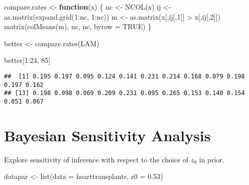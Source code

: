 \documentclass[
]{book}
\newenvironment{Shaded}{\begin{snugshade}}{\end{snugshade}}
\newcommand{\AttributeTok}[1]{\textcolor[rgb]{0.77,0.63,0.00}{#1}}
\newcommand{\ConstantTok}[1]{\textcolor[rgb]{0.00,0.00,0.00}{#1}}
\newcommand{\ControlFlowTok}[1]{\textcolor[rgb]{0.13,0.29,0.53}{\textbf{#1}}}
\newcommand{\DecValTok}[1]{\textcolor[rgb]{0.00,0.00,0.81}{#1}}
\newcommand{\FloatTok}[1]{\textcolor[rgb]{0.00,0.00,0.81}{#1}}
\newcommand{\FunctionTok}[1]{\textcolor[rgb]{0.00,0.00,0.00}{#1}}
\newcommand{\NormalTok}[1]{#1}
\newcommand{\OtherTok}[1]{\textcolor[rgb]{0.56,0.35,0.01}{#1}}
\newcommand{\SpecialCharTok}[1]{\textcolor[rgb]{0.00,0.00,0.00}{#1}}
\begin{document}
\begin{Shaded}
\begin{Highlighting}[]
\NormalTok{compare.rates }\OtherTok{\textless{}{-}} \ControlFlowTok{function}\NormalTok{(x) \{}
\NormalTok{  nc }\OtherTok{\textless{}{-}} \FunctionTok{NCOL}\NormalTok{(x)}
\NormalTok{  ij }\OtherTok{\textless{}{-}} \FunctionTok{as.matrix}\NormalTok{(}\FunctionTok{expand.grid}\NormalTok{(}\DecValTok{1}\SpecialCharTok{:}\NormalTok{nc, }\DecValTok{1}\SpecialCharTok{:}\NormalTok{nc))}
\NormalTok{  m }\OtherTok{\textless{}{-}} \FunctionTok{as.matrix}\NormalTok{(x[,ij[,}\DecValTok{1}\NormalTok{]] }\SpecialCharTok{\textgreater{}}\NormalTok{ x[,ij[,}\DecValTok{2}\NormalTok{]])}
  \FunctionTok{matrix}\NormalTok{(}\FunctionTok{colMeans}\NormalTok{(m), nc, nc, }\AttributeTok{byrow =} \ConstantTok{TRUE}\NormalTok{)}
\NormalTok{\}}
\end{Highlighting}
\end{Shaded}

\begin{Shaded}
\begin{Highlighting}[]
\NormalTok{better }\OtherTok{\textless{}{-}} \FunctionTok{compare.rates}\NormalTok{(LAM)}
\end{Highlighting}
\end{Shaded}

\begin{Shaded}
\begin{Highlighting}[]
\NormalTok{better[}\DecValTok{1}\SpecialCharTok{:}\DecValTok{24}\NormalTok{, }\DecValTok{85}\NormalTok{]}
\end{Highlighting}
\end{Shaded}

\begin{verbatim}
##  [1] 0.195 0.197 0.095 0.124 0.141 0.231 0.214 0.168 0.079 0.198 0.197 0.162
## [13] 0.198 0.098 0.069 0.209 0.231 0.095 0.265 0.153 0.140 0.154 0.051 0.067
\end{verbatim}

\hypertarget{bayesian-sensitivity-analysis}{%
\section{Bayesian Sensitivity Analysis}\label{bayesian-sensitivity-analysis}}

Explore sensitivity of inference with respect to the choice of \(z_0\) in prior.

\begin{Shaded}
\begin{Highlighting}[]
\NormalTok{datapar }\OtherTok{\textless{}{-}} \FunctionTok{list}\NormalTok{(}\AttributeTok{data =}\NormalTok{ hearttransplants, }
                \AttributeTok{z0 =} \FloatTok{0.53}\NormalTok{)}
\end{Highlighting}
\end{Shaded}
\end{document}
